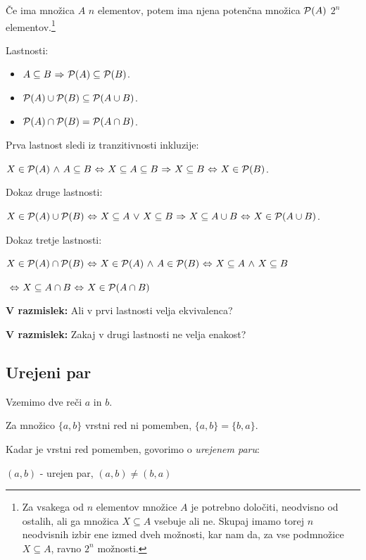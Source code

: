 \documentclass[11pt,paper=b5,DIV=13,headinclude,footinclude]{scrbook}
\def\P {{\cal P}}
\def\ali {{~\vee~}}
\def\inn {{~\wedge~}}
\def\sledi {{~\Rightarrow~}}
\def\cee {{~\Leftrightarrow~}}
\begin{document}
Če ima množica $A$ $n$ elementov, potem ima njena potenčna množica ${\cal P}(A)$ $2^n$ elementov.\footnote{Za vsakega od $n$ elementov množice $A$ je potrebno določiti, neodvisno od ostalih, ali ga množica $X\subseteq A$ vsebuje ali ne. Skupaj imamo torej $n$ neodvisnih izbir ene izmed dveh možnosti, kar nam da, za vse podmnožice $X\subseteq A$, ravno $2^n$ možnosti.}

\bigskip
Lastnosti:
\begin{itemize}
  \item $A\subseteq B\sledi \P(A) \subseteq \P(B)$.
  \item $\P(A) \cup \P(B) \subseteq \P(A\cup B)$.
  \item $\P(A)\cap \P(B) =  \P(A\cap B)$.
\end{itemize}

Prva lastnost sledi iz tranzitivnosti inkluzije:

$X\in \P(A) \inn A\subseteq B\cee X\subseteq A\subseteq B\sledi X\subseteq B\cee X\in \P(B)$.

Dokaz druge lastnosti:

$X\in \P(A) \cup \P(B) \cee X\subseteq A\ali X\subseteq B\sledi X\subseteq A\cup B\cee X\in \P(A\cup B)$.


Dokaz tretje lastnosti:

$X\in \P(A)\cap \P(B)\cee X\in \P(A) \inn A\in \P(B)\cee X\subseteq A \inn X\subseteq B$

$\cee X\subseteq A \cap B\cee X\in \P(A\cap B)$

%

\medskip
\textbf{ V razmislek:} Ali v prvi lastnosti velja ekvivalenca?

\medskip
\textbf{ V razmislek:} Zakaj v drugi lastnosti ne velja enakost?


\subsection{Urejeni par}

Vzemimo dve reči $a$ in $b$.

Za množico $\{a,b\}$ vrstni red ni pomemben, $\{a,b\} = \{b,a\}$.

Kadar je vrstni red pomemben, govorimo o {\em urejenem paru}:

$(a,b)$ - urejen par, $(a,b)\neq (b,a)$
\end{document}
